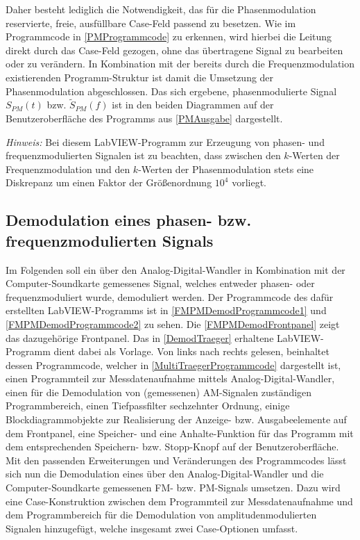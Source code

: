 \documentclass[
a4paper,
12pt,
pagesize,
ngerman
]{scrartcl}
\begin{document}
	\noindent Daher besteht lediglich die Notwendigkeit, das für die Phasenmodulation reservierte, freie, ausfüllbare Case-Feld passend zu besetzen. %
	Wie im Programmcode in \cref{PMProgrammcode} zu erkennen, wird hierbei die Leitung direkt durch das Case-Feld gezogen, ohne das übertragene Signal zu bearbeiten oder zu verändern. 
	In Kombination mit der bereits durch die Frequenzmodulation existierenden Programm-Struktur ist damit die Umsetzung der Phasenmodulation abgeschlossen. 
	Das sich ergebene, phasenmodulierte Signal $S_{PM}(t)$ bzw. $\tilde{S}_{PM}(f)$ ist in den beiden Diagrammen auf der Benutzeroberfläche des Programms aus \cref{PMAusgabe} dargestellt.
	
	\emph{Hinweis:} Bei diesem LabVIEW-Programm zur Erzeugung von phasen- und frequenzmodulierten Signalen ist zu beachten, dass zwischen den $k$-Werten der Frequenzmodulation und den $k$-Werten der Phasenmodulation stets eine Diskrepanz um einen Faktor der Größenordnung $10^4$ vorliegt. %
	
	
	\subsection{Demodulation eines phasen- bzw. frequenzmodulierten Signals}
	
	Im Folgenden soll ein über den Analog-Digital-Wandler in Kombination mit der Computer-Soundkarte gemessenes Signal, welches entweder phasen- oder frequenzmoduliert wurde, demoduliert werden. 
	Der Programmcode des dafür erstellten LabVIEW-Programms ist in \cref{FMPMDemodProgrammcode1} und \cref{FMPMDemodProgrammcode2} zu sehen.
	Die \cref{FMPMDemodFrontpanel} zeigt das dazugehörige Frontpanel.
	Das in \cref{DemodTraeger} erhaltene LabVIEW-Programm dient dabei als Vorlage. 
	Von links nach rechts gelesen, beinhaltet dessen Programmcode, welcher in \cref{MultiTraegerProgrammcode} dargestellt ist, einen Programmteil zur Messdatenaufnahme mittels Analog-Digital-Wandler, einen für die Demodulation von (gemessenen) AM-Signalen zuständigen Programmbereich, einen Tiefpassfilter sechzehnter Ordnung, einige Blockdiagrammobjekte zur Realisierung der Anzeige- bzw. Ausgabeelemente auf dem Frontpanel, eine Speicher- und eine Anhalte-Funktion für das Programm mit dem entsprechenden \glqq Speichern\grqq - bzw. \glqq Stopp\grqq -Knopf auf der Benutzeroberfläche.
	Mit den passenden Erweiterungen und Veränderungen des Programmcodes lässt sich nun die Demodulation eines über den Analog-Digital-Wandler und die Computer-Soundkarte gemessenen FM- bzw. PM-Signals umsetzen. 
	Dazu wird eine Case-Konstruktion zwischen dem Programmteil zur Messdatenaufnahme und dem Programmbereich für die Demodulation von amplitudenmodulierten Signalen hinzugefügt, welche insgesamt zwei Case-Optionen umfasst.
	
\end{document}
